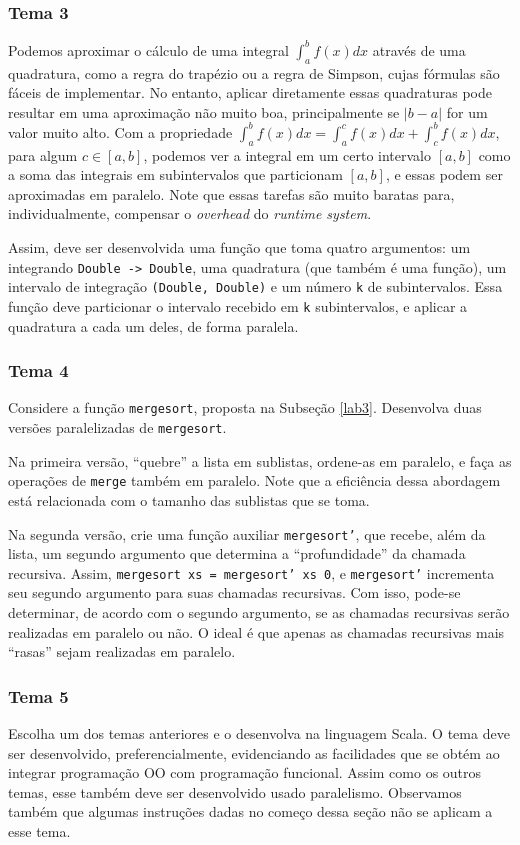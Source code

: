 \documentclass[a4paper]{article}
\begin{document}
\subsubsection{Tema 3}

Podemos aproximar o cálculo de uma integral $\int_a^b f(x) dx$ através de uma
quadratura, como a regra do trapézio ou a regra de Simpson, cujas fórmulas são
fáceis de implementar.
No entanto, aplicar diretamente essas quadraturas pode resultar em uma
aproximação não muito boa, principalmente se $|b - a|$ for um valor muito alto.
Com a propriedade $\int_a^b f(x) dx = \int_a^c f(x) dx + \int_c^b f(x) dx$, para
algum $c \in [a, b]$, podemos ver a integral em um
certo intervalo $[a, b]$ como a soma das integrais em subintervalos que particionam $[a,
b]$, e essas podem ser aproximadas em paralelo.
Note que essas tarefas são muito baratas para, individualmente, compensar o \emph{overhead} do
\emph{runtime system}.

Assim, deve ser desenvolvida uma função que toma quatro argumentos:
um integrando \mbox{\texttt{Double -> Double}}, uma quadratura (que também é uma função),
um intervalo de integração \mbox{\texttt{(Double, Double)}} e um número \texttt{k} de subintervalos.
Essa função deve particionar o intervalo recebido em \texttt{k} subintervalos, e
aplicar a quadratura a cada um deles, de forma paralela.

\subsubsection{Tema 4}

Considere a função \texttt{mergesort}, proposta na Subseção \ref{lab3}.
Desenvolva duas versões paralelizadas de \texttt{mergesort}.

Na primeira versão, ``quebre'' a lista em sublistas, ordene-as em paralelo, e
faça as operações de \texttt{merge} também em paralelo.
Note que a eficiência dessa abordagem está relacionada com o tamanho das
sublistas que se toma.

Na segunda versão, crie uma função auxiliar \texttt{mergesort'}, que recebe,
além da lista, um segundo argumento que determina a ``profundidade'' da chamada recursiva.
Assim, \texttt{mergesort xs = mergesort' xs 0}, e \texttt{mergesort'} incrementa
seu segundo argumento para suas chamadas recursivas.
Com isso, pode-se determinar, de acordo com o segundo argumento, se as chamadas
recursivas serão realizadas em paralelo ou não.
O ideal é que apenas as chamadas recursivas mais ``rasas'' sejam realizadas em
paralelo.

\subsubsection{Tema 5}

Escolha um dos temas anteriores e o desenvolva na linguagem Scala.
O tema deve ser desenvolvido, preferencialmente, evidenciando as facilidades que
se obtém ao integrar programação OO com programação funcional.
Assim como os outros temas, esse também deve ser desenvolvido usado paralelismo.
Observamos também que algumas instruções dadas no começo dessa seção não se
aplicam a esse tema.
\end{document}
